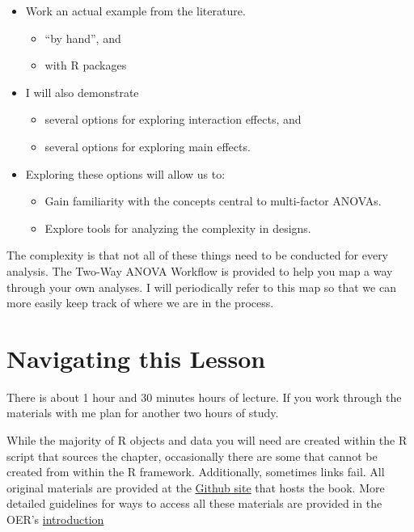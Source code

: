 \documentclass[
  11pt,
]{book}
\providecommand{\tightlist}{%
  \setlength{\itemsep}{0pt}\setlength{\parskip}{0pt}}
\begin{document}
\begin{itemize}
\tightlist
\item
  Work an actual example from the literature.

  \begin{itemize}
  \tightlist
  \item
    ``by hand'', and
  \item
    with R packages
  \end{itemize}
\item
  I will also demonstrate

  \begin{itemize}
  \tightlist
  \item
    several options for exploring interaction effects, and
  \item
    several options for exploring main effects.
  \end{itemize}
\item
  Exploring these options will allow us to:

  \begin{itemize}
  \tightlist
  \item
    Gain familiarity with the concepts central to multi-factor ANOVAs.
  \item
    Explore tools for analyzing the complexity in designs.
  \end{itemize}
\end{itemize}

The complexity is that not all of these things need to be conducted for every analysis. The Two-Way ANOVA Workflow is provided to help you map a way through your own analyses. I will periodically refer to this map so that we can more easily keep track of where we are in the process.

\hypertarget{navigating-this-lesson-6}{%
\section{Navigating this Lesson}\label{navigating-this-lesson-6}}

There is about 1 hour and 30 minutes hours of lecture. If you work through the materials with me plan for another two hours of study.

While the majority of R objects and data you will need are created within the R script that sources the chapter, occasionally there are some that cannot be created from within the R framework. Additionally, sometimes links fail. All original materials are provided at the \href{https://github.com/lhbikos/ReCenterPsychStats}{Github site} that hosts the book. More detailed guidelines for ways to access all these materials are provided in the OER's \protect\hyperlink{ReCintro}{introduction}
\end{document}
